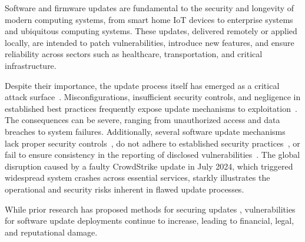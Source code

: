 \documentclass[fleqn,s1,names,tex]{neptune}
\begin{document}
   





Software and firmware updates are fundamental to the security and longevity of modern computing systems, from smart home IoT devices to enterprise systems and ubiquitous computing systems. 
These updates, delivered remotely or applied locally, are intended to patch vulnerabilities, introduce new features, and ensure reliability across sectors such as healthcare, transportation, and critical infrastructure.










  




Despite their importance, the update process itself has emerged as a critical
attack surface~\citep{294541}. Misconfigurations, insufficient security
controls, and negligence in established best practices frequently expose update
mechanisms to exploitation~\citep{10.1007/978-3-031-92886-4_7}. 
The consequences can be severe, ranging from unauthorized access and data
breaches to system failures. Additionally, several software update mechanisms
lack proper security controls~\citep{268927,10.1109/MSP.2012.113}, do not
adhere to established security practices~\citep{10.1007/978-3-031-30122-3_25},
or fail to ensure consistency in the reporting of disclosed
vulnerabilities~\citep{10.1007/978-3-032-02504-3_29}. 
The global disruption caused by a faulty CrowdStrike update in July 2024, which triggered widespread system crashes across essential services, starkly illustrates the operational and security risks inherent in flawed update processes.





  

While prior research has proposed methods for securing
updates \ubrk \citep{10.1145/3344948.3344972,8493602,294541}, vulnerabilities for
software update deployments continue to increase, leading to financial, legal,
and reputational damage. 



  
\end{document}
